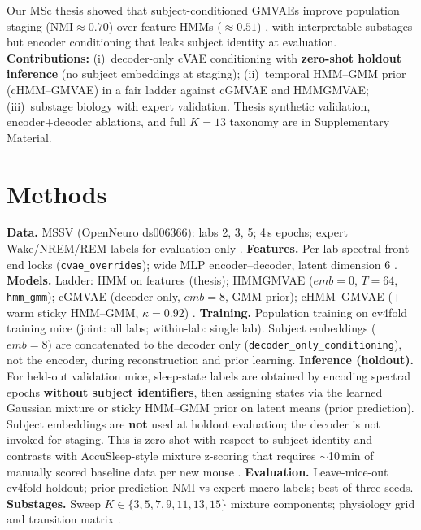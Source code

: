 \documentclass[10pt,twocolumn]{article}
\begin{document}
Our MSc thesis showed that subject-conditioned GMVAEs improve population staging ($\mathrm{NMI}\approx 0.70$) over feature HMMs ($\approx 0.51$) \cite{elmgreen2026thesis}, with interpretable substages but encoder conditioning that leaks subject identity at evaluation.
\textbf{Contributions:} (i)~decoder-only cVAE conditioning with \textbf{zero-shot holdout inference} (no subject embeddings at staging); (ii)~temporal HMM--GMM prior (cHMM--GMVAE) in a fair ladder against cGMVAE and HMMGMVAE; (iii)~substage biology with expert validation.
Thesis synthetic validation, encoder+decoder ablations, and full $K{=}13$ taxonomy are in Supplementary Material.

\section{Methods}
\textbf{Data.} MSSV (OpenNeuro ds006366): labs 2, 3, 5; 4\,s epochs; expert Wake/NREM/REM labels for evaluation only \cite{rose2025mssv}.
\textbf{Features.} Per-lab spectral front-end locks (\texttt{cvae\_overrides}); wide MLP encoder--decoder, latent dimension 6 \cite{elmgreen2026thesis}.
\textbf{Models.} Ladder: HMM on features (thesis); HMMGMVAE ($\mathit{emb}{=}0$, $T{=}64$, \texttt{hmm\_gmm}); cGMVAE (decoder-only, $\mathit{emb}{=}8$, GMM prior); cHMM--GMVAE (+ warm sticky HMM--GMM, $\kappa{=}0.92$) \cite{dilokthanakul2016gmvae,sohn2015cvae,ebbers2017hmmvae,johnson2016svae}.
\textbf{Training.} Population training on cv4fold training mice (joint: all labs; within-lab: single lab). Subject embeddings ($\mathit{emb}{=}8$) are concatenated to the decoder only (\texttt{decoder\_only\_conditioning}), not the encoder, during reconstruction and prior learning.
\textbf{Inference (holdout).} For held-out validation mice, sleep-state labels are obtained by encoding spectral epochs \textbf{without subject identifiers}, then assigning states via the learned Gaussian mixture or sticky HMM--GMM prior on latent means (prior prediction). Subject embeddings are \textbf{not} used at holdout evaluation; the decoder is not invoked for staging. This is zero-shot with respect to subject identity and contrasts with AccuSleep-style mixture z-scoring that requires $\sim$10\,min of manually scored baseline data per new mouse \cite{barger2019accusleep}.
\textbf{Evaluation.} Leave-mice-out cv4fold holdout; prior-prediction NMI vs expert macro labels; best of three seeds.
\textbf{Substages.} Sweep $K\in\{3,5,7,9,11,13,15\}$ mixture components; physiology grid and transition matrix \cite{katsageorgiou2018mcRBM,grieger2021prerem}.
\end{document}
